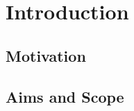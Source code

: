 \chapter[Introduction]{Introduction}
\label{Chap:Introduction}


\section{Motivation}
\section{Aims and Scope}